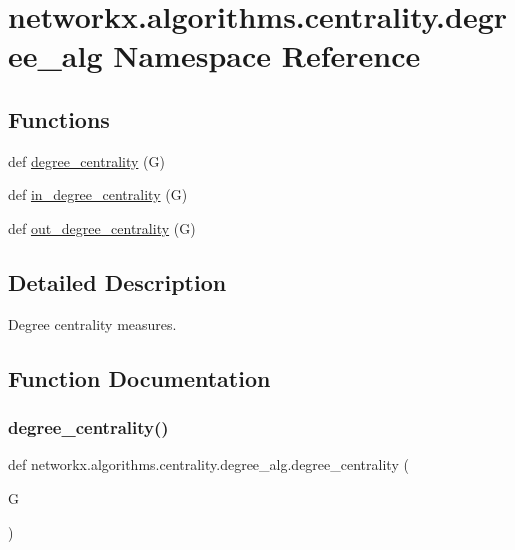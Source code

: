\hypertarget{namespacenetworkx_1_1algorithms_1_1centrality_1_1degree__alg}{}\section{networkx.\+algorithms.\+centrality.\+degree\+\_\+alg Namespace Reference}
\label{namespacenetworkx_1_1algorithms_1_1centrality_1_1degree__alg}
\subsection*{Functions}
\begin{DoxyCompactItemize}
\item 
def \hyperlink{namespacenetworkx_1_1algorithms_1_1centrality_1_1degree__alg_a3388786391092a812d5cd90ea036969d}{degree\+\_\+centrality} (G)
\item 
def \hyperlink{namespacenetworkx_1_1algorithms_1_1centrality_1_1degree__alg_adb5a7769931b930d9e7a864745df51fa}{in\+\_\+degree\+\_\+centrality} (G)
\item 
def \hyperlink{namespacenetworkx_1_1algorithms_1_1centrality_1_1degree__alg_a3ac985a84d8b050ed24d926bb17bb090}{out\+\_\+degree\+\_\+centrality} (G)
\end{DoxyCompactItemize}


\subsection{Detailed Description}
\begin{DoxyVerb}Degree centrality measures.\end{DoxyVerb}
 

\subsection{Function Documentation}
\mbox{\label{namespacenetworkx_1_1algorithms_1_1centrality_1_1degree__alg_a3388786391092a812d5cd90ea036969d}} 
\subsubsection{\texorpdfstring{degree\+\_\+centrality()}{degree\_centrality()}}
{\footnotesize\ttfamily def networkx.\+algorithms.\+centrality.\+degree\+\_\+alg.\+degree\+\_\+centrality (\begin{DoxyParamCaption}\item[{}]{G }\end{DoxyParamCaption})}


